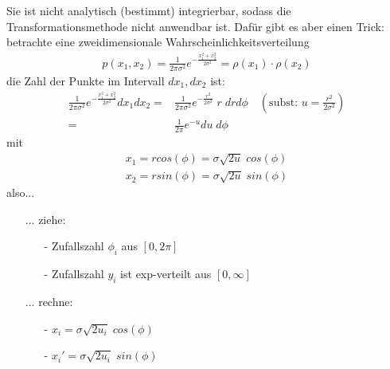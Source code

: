 \documentclass[12pt]{article}
\begin{document}
\begin{itemize}
Sie ist nicht analytisch (bestimmt) integrierbar, sodass die Transformationsmethode nicht anwendbar ist. Dafür gibt es aber einen Trick: \\
betrachte eine zweidimensionale Wahrscheinlichkeitsverteilung
\begin{align}
p(x_1,x_2)=\frac{1}{	2 \pi \sigma^2} e^{- \frac{x_1^2 + x_2^2}{2 \sigma^2}} = \rho(x_1) \cdot \rho(x_2)
\end{align}
die Zahl der Punkte im Intervall $dx_1, dx_2$ ist:
\begin{align}
\frac{1}{	2 \pi \sigma^2} e^{- \frac{x_1^2 + x_2^2}{2 \sigma^2}} dx_1 dx_2= & \frac{1}{	2 \pi \sigma^2} e^{- \frac{r^2}{2 \sigma^2}} \;r \; dr  d\phi \quad \left( \mbox{subst: } u = \frac{r^2}{2 \sigma^2} \right) \\
= & \frac{1}{2 \pi} e^{-u} du \; d\phi
\end{align}
mit
\begin{align*}
x_1=  r cos(\phi) = \sigma \sqrt{2 u} \; cos(\phi) \\
x_2=  r sin(\phi)= \sigma \sqrt{2 u} \; sin(\phi)
\end{align*}
also...
\begin{itemize}
\item[...] ziehe: 
\begin{itemize}
\item[-] Zufallszahl $\phi_i$ aus $[0,2\pi]$
\item[-] Zufallszahl $y_i$ ist exp-verteilt aus $[0, \infty]$
\end{itemize}
\item[...]rechne:
\begin{itemize}
\item[-] $x_i = \sigma \sqrt{2 u_i} \; cos(\phi)$
\item[-] $x_i' = \sigma \sqrt{2 u_i} \; sin(\phi)$
\end{itemize}
\end{itemize}




\end{itemize}
\end{document}
